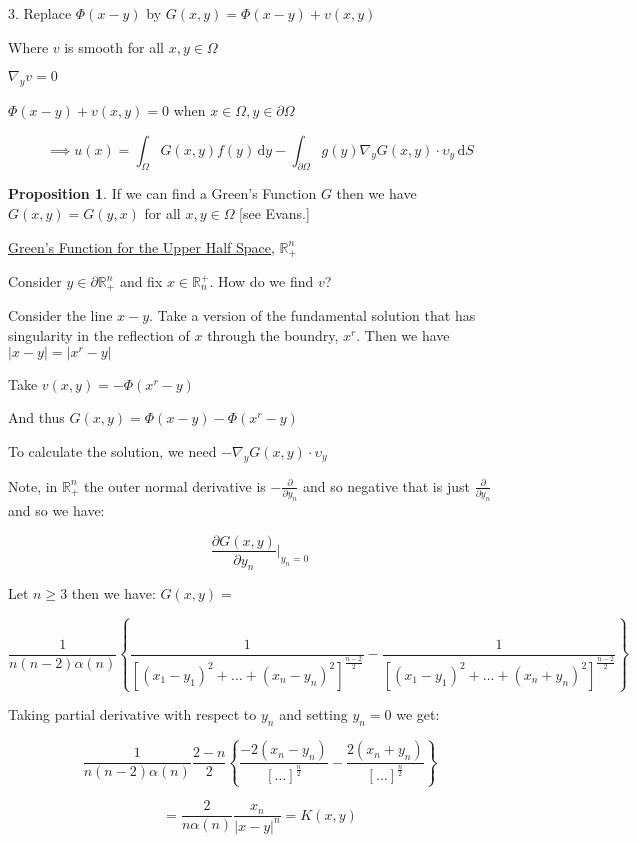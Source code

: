 \documentclass{article}
\theoremstyle{definition}
\newtheorem{proposition}{Proposition}
\begin{document}
3. Replace \(\Phi(x-y)\) by \(G(x,y)=\Phi(x-y)+v(x,y)\) 

Where \(v\) is smooth for all \(x,y\in \Omega \) 

\(\nabla_y v = 0\) 

\(\Phi(x-y)+v(x,y)=0\) when \(x\in \Omega ,y\in \partial \Omega\) 

\[
    \implies u(x)=\int_{\Omega}^{} G(x,y)f(y) \,\mathrm{d}y - \int_{\partial \Omega }^{} g(y)\nabla_y G(x,y)\cdot \upsilon _y \,\mathrm{d}S 
\]

\begin{proposition}
    If we can find a Green's Function \(G\) then we have \(G(x,y)=G(y,x)\) for all \(x,y\in \Omega \) [see Evans.]
\end{proposition}

\underline{Green's Function for the Upper Half Space}, \(\mathbb{R} ^n_+\) 

Consider \(y\in \partial \mathbb{R} ^n_+\) and fix \(x\in\mathbb{R} _n^+\). How do we find \(v\)?

Consider the line \(x-y\). Take a version of the fundamental solution that has singularity in the reflection of \(x\) through the boundry, \(x^r\). Then we have \(\vert x-y \vert = \vert x^r - y \vert \) 

Take \(v(x,y)=-\Phi(x^r - y)\)

And thus \(G(x,y)=\Phi(x-y) - \Phi(x^r - y)\) 

To calculate the solution, we need \(-\nabla_y G(x,y)\cdot \upsilon _y\) 

Note, in \(\mathbb{R} ^n_+\) the outer normal derivative is \(-\frac{\partial}{\partial y_n} \) and so negative that is just \(\frac{\partial }{\partial y_n} \) and so we have:

\[
    \frac{\partial G(x,y)}{\partial y_n} \bigg|_{y_n=0}
\]

Let \(n \geq 3\) then we have: \(G(x,y)=\) 

\[
    \frac{1}{n(n-2)\alpha (n)}\left\{ \frac{1}{[(x_1 - y_1)^2 + \dots + (x_n - y_n)^2]^{\frac{n-2}{2}}} - \frac{1}{[(x_1 - y_1)^2 + \dots + (x_n + y_n)^2]^{\frac{n-2}{2}}} \right\} 
\]

Taking partial derivative with respect to \(y_n\) and setting \(y_n = 0\) we get:

\[
    \frac{1}{n(n-2)\alpha (n)}\frac{2-n}{2}\left\{ \frac{-2(x_n - y_n)}{[\dots]^{\frac{n}{2}}} - \frac{2(x_n + y_n)}{[\dots]^{\frac{n}{2}}} \right\} 
\]

\[
    =\frac{2}{n \alpha (n)} \frac{x_n}{\vert x - y \vert ^n} = K(x,y)
\]
\end{document}
